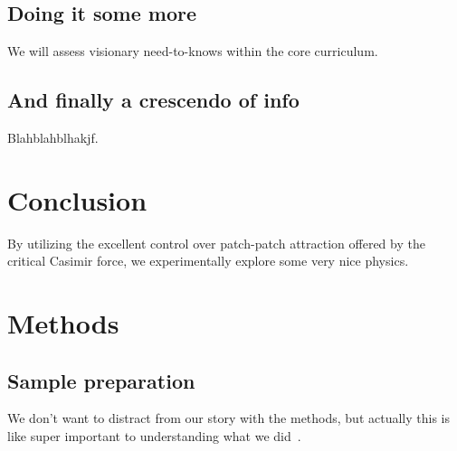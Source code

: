 \documentclass{article}
\begin{document}
\subsection{Doing it some more}
We will assess visionary need-to-knows within the core curriculum.


\subsection{And finally a crescendo of info}

Blahblahblhakjf.

\section{Conclusion}
By utilizing the excellent control over patch-patch attraction offered by the critical Casimir force, we experimentally explore some very nice physics.

\section{Methods}
\subsection*{Sample preparation}
We don't want to distract from our story with the methods, but actually this is like super important to understanding what we did~\cite{ExampleThesis}.



\end{document}
